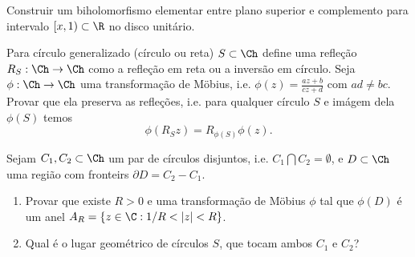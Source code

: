 \begin{problema}
Construir um biholomorfismo elementar entre
plano superior e complemento para intervalo $[x,1) \subset \R$
no disco unitário.
\end{problema}

\begin{problema}
Para círculo generalizado (círculo ou reta) $S \subset \Ch$ define uma refleção
$R_S : \Ch \to \Ch$ como a refleção em reta ou a inversão em círculo.
Seja $\phi: \Ch \to \Ch$ uma transformação de Möbius, i.e. $\phi(z) = \frac{az+b}{cz+d}$
com $ad\neq bc$. Provar que ela preserva as refleções, i.e. para qualquer
círculo $S$ e imágem dela $\phi(S)$ temos
\[ \phi(R_S z) = R_{\phi(S)} \phi(z) . \]
\end{problema}

\begin{problema}
Sejam $C_1,C_2 \subset \Ch$ um par de círculos disjuntos, i.e. $C_1 \bigcap C_2 = \emptyset$,
e $D \subset \Ch$ uma região com fronteirs $\partial D = C_2 - C_1$.
\begin{enumerate}
\item Provar que existe $R>0$ e uma transformação de Möbius $\phi$ tal que
$\phi(D)$ é um anel $A_R = \{ z\in\C: 1/R < |z| < R \}$.
\item Qual é o lugar geométrico de círculos $S$, que tocam ambos $C_1$ e $C_2$?
\end{enumerate}
\end{problema}
